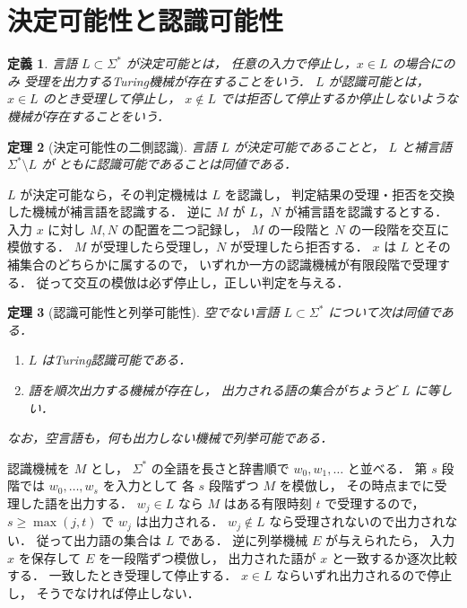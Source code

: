 \documentclass[a5paper,10pt,onecolumn]{jsarticle}
\makeatletter
\theoremstyle{mathnotetheorem}
\newtheorem{theorem}{定理}[section]
\newtheorem{definition}[theorem]{定義}
\renewcommand{\proofname}{証明}
\renewenvironment{proof}[1][\proofname]{%
  \par\pushQED{\qed}\normalfont\topsep4\p@\@plus2\p@\relax
  \trivlist\item[\hskip\labelsep\bfseries #1]\ignorespaces
}{\popQED\endtrivlist\@endpefalse}
\makeatother
\begin{document}
\section{決定可能性と認識可能性}
\begin{definition}
言語 $L\subset\Sigma^*$ が決定可能とは，
任意の入力で停止し，$x\in L$ の場合にのみ
受理を出力するTuring機械が存在することをいう．
$L$ が認識可能とは，$x\in L$ のとき受理して停止し，
$x\notin L$ では拒否して停止するか停止しないような
機械が存在することをいう．
\end{definition}
\begin{theorem}[決定可能性の二側認識]\label{thm:both}
言語 $L$ が決定可能であることと，
$L$ と補言語 $\Sigma^*\setminus L$ が
ともに認識可能であることは同値である．
\end{theorem}
\begin{proof}
$L$ が決定可能なら，その判定機械は $L$ を認識し，
判定結果の受理・拒否を交換した機械が補言語を認識する．
逆に $M$ が $L$，$N$ が補言語を認識するとする．
入力 $x$ に対し $M,N$ の配置を二つ記録し，
$M$ の一段階と $N$ の一段階を交互に模倣する．
$M$ が受理したら受理し，$N$ が受理したら拒否する．
$x$ は $L$ とその補集合のどちらかに属するので，
いずれか一方の認識機械が有限段階で受理する．
従って交互の模倣は必ず停止し，正しい判定を与える．
\end{proof}
\begin{theorem}[認識可能性と列挙可能性]\label{thm:enumerate}
空でない言語 $L\subset\Sigma^*$ について次は同値である．
\begin{enumerate}
\item $L$ はTuring認識可能である．
\item 語を順次出力する機械が存在し，
 出力される語の集合がちょうど $L$ に等しい．
\end{enumerate}
なお，空言語も，何も出力しない機械で列挙可能である．
\end{theorem}
\begin{proof}
認識機械を $M$ とし，
$\Sigma^*$ の全語を長さと辞書順で
$w_0,w_1,\ldots$ と並べる．
第 $s$ 段階では $w_0,\ldots,w_s$ を入力として
各 $s$ 段階ずつ $M$ を模倣し，
その時点までに受理した語を出力する．
$w_j\in L$ なら $M$ はある有限時刻 $t$ で受理するので，
$s\ge\max(j,t)$ で $w_j$ は出力される．
$w_j\notin L$ なら受理されないので出力されない．
従って出力語の集合は $L$ である．
逆に列挙機械 $E$ が与えられたら，
入力 $x$ を保存して $E$ を一段階ずつ模倣し，
出力された語が $x$ と一致するか逐次比較する．
一致したとき受理して停止する．
$x\in L$ ならいずれ出力されるので停止し，
そうでなければ停止しない．
\end{proof}
\end{document}
